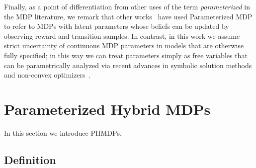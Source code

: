 \documentclass[letterpaper]{article}
\begin{document}
Finally, as a point of differentiation from other uses of the term \emph{parameterized} in the MDP literature, we remark that other works~\cite{Doshi-VelezK16,Duff_UMA_2002,Dearden_UAI_1999,Gopalan_COLT_2015} have used Parameterized MDP to refer to MDPs with latent parameters whose beliefs can be updated by observing reward and transition samples. In contrast, in this work we assume strict uncertainty of continuous MDP parameters in models that are otherwise fully specified; in this way we can treat parameters simply as free variables that can be parametrically analyzed via recent advances in symbolic solution methods and non-convex optimizers~\cite{Gao2013}.

\section{Parameterized Hybrid MDPs}
\label{sec:hybrid_mdps}

In this section we introduce PHMDPs.

\subsection{Definition}
\label{sec:phmdp_def}
\end{document}
